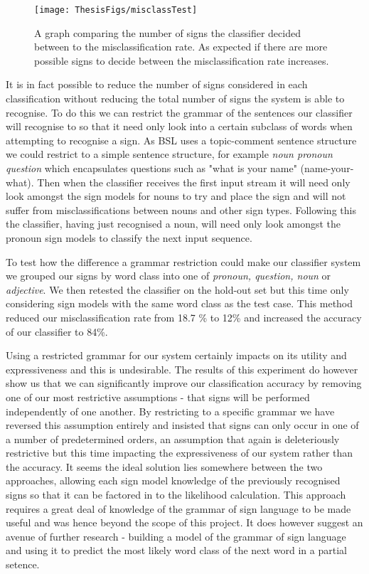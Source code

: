 \begin{figure}[]
        \centering
        \texttt{[image: ThesisFigs/misclassTest]}
        \caption{A graph comparing the number of signs the classifier decided between to the misclassification rate. As expected if there are more possible signs to decide between the misclassification rate increases.}\label{fig:misclassTest}
\end{figure}

It is in fact possible to reduce the number of signs considered in each classification without reducing the total number of signs the system is able to recognise. To do this we can restrict the grammar of the sentences our classifier will recognise to so that it need only look into a certain subclass of words when attempting to recognise a sign. As BSL uses a topic-comment sentence structure we could restrict to a simple sentence structure, for example \emph{noun pronoun question} which encapsulates questions such as "what is your name" (name-your-what). Then when the classifier receives the first input stream it will need only look amongst the sign models for nouns to try and place the sign and will not suffer from misclassifications between nouns and other sign types. Following this the classifier, having just recognised a noun, will need only look amongst the pronoun sign models to classify the next input sequence. 

To test how the difference a grammar restriction could make our classifier system we grouped our signs by word class into one of \emph{pronoun, question, noun} or \emph{adjective}. We then retested the classifier on the hold-out set but this time only considering sign models with the same word class as the test case. This method reduced our misclassification rate from 18.7 \% to 12\% and increased the accuracy of our classifier to 84\%.

Using a restricted grammar for our system certainly impacts on its utility and expressiveness and this is undesirable. The results of this experiment do however show us that we can significantly improve our classification accuracy by removing one of our most restrictive assumptions - that signs will be performed independently of one another. By restricting to a specific grammar we have reversed this assumption entirely and insisted that signs can only occur in one of a number of predetermined orders, an assumption that again is deleteriously restrictive but this time impacting the expressiveness of our system rather than the accuracy. It seems the ideal solution lies somewhere between the two approaches, allowing each sign model knowledge of the previously recognised signs so that it can be factored in to the likelihood calculation. This approach requires a great deal of knowledge of the grammar of sign language to be made useful and was hence beyond the scope of this project. It does however suggest an avenue of further research - building a model of the grammar of sign language and using it to predict the most likely word class of the next word in a partial setence.

